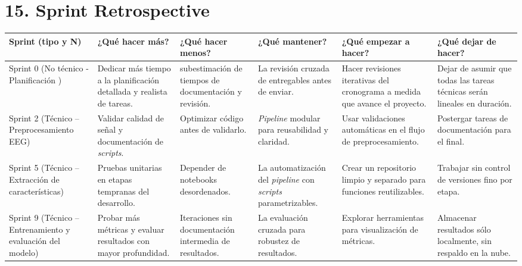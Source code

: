 \documentclass[
11pt, %
]{charter}
\begin{document}
\section{15. Sprint Retrospective}    
\label{sec:sprint_retro}
\begin{table}[H]
\centering
\renewcommand{\arraystretch}{1.5}
\begin{tabularx}{\textwidth}{|>{\centering\arraybackslash}m{2.8cm}|
								  >{\raggedright\arraybackslash}X|
								  >{\raggedright\arraybackslash}X|
								  >{\raggedright\arraybackslash}X|
								  >{\raggedright\arraybackslash}X|
								  >{\raggedright\arraybackslash}X|}
\hline
\rowcolor[HTML]{C0C0C0}
\textbf{Sprint (tipo y N)} & \textbf{¿Qué hacer más?} & \textbf{¿Qué hacer menos?} & \textbf{¿Qué mantener?} & \textbf{¿Qué empezar a hacer?} & \textbf{¿Qué dejar de hacer?} \\
\hline
Sprint 0 (No técnico - Planificación ) &
Dedicar más tiempo a la planificación detallada y realista de tareas. &
subestimación de tiempos de documentación y revisión. &
La revisión cruzada de entregables antes de enviar. &
Hacer revisiones iterativas del cronograma a medida que avance el proyecto. &
Dejar de asumir que todas las tareas técnicas serán lineales en duración. \\
\hline
Sprint 2 (Técnico – Preprocesamiento EEG) &
Validar calidad de señal y documentación de \textit{scripts}. &
Optimizar código antes de validarlo. &
\textit{Pipeline} modular para reusabilidad y claridad. &
Usar validaciones automáticas en el flujo de preprocesamiento. &
Postergar tareas de documentación para el final. \\
\hline
Sprint 5 (Técnico – Extracción de características) &
Pruebas unitarias en etapas tempranas del desarrollo. &
Depender de notebooks desordenados. &
La automatización del \textit{pipeline} con \textit{scripts} parametrizables. &
Crear un repositorio limpio y separado para funciones reutilizables. &
Trabajar sin control de versiones fino por etapa. \\
\hline
Sprint 9 (Técnico – Entrenamiento y evaluación del modelo) &
Probar más métricas y evaluar resultados con mayor profundidad. &
Iteraciones sin documentación intermedia de resultados. &
La evaluación cruzada para robustez de resultados. &
Explorar herramientas para visualización de métricas. &
Almacenar resultados sólo localmente, sin respaldo en la nube. \\
\hline
\end{tabularx}
\end{table}
\end{document}
